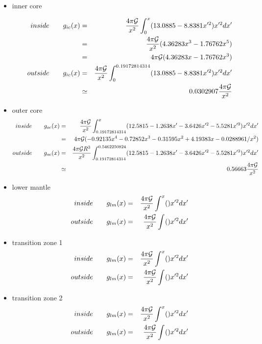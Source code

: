 \begin{itemize}
\item inner core 

\begin{eqnarray}
inside \qquad g_{ic}(x)
&=& \frac{4 \pi {\cal G}}{x^2} \int_0^{x} (13.0885-8.8381 x'^2) x'^2 dx' \nonumber\\
&=& \frac{4 \pi {\cal G}}{x^2} (4.36283x^3-1.76762x^5) \nonumber\\
&=& 4 \pi {\cal G} (4.36283x-1.76762x^3) \\
outside \qquad g_{ic}(x)
&=&  \frac{4 \pi {\cal G}}{x^2} \int_0^{0.19172814314} (13.0885-8.8381 x'^2) x'^2 dx' \nonumber\\
&\simeq& 0.0302907  \frac{4 \pi {\cal G}}{x^2}
\end{eqnarray}



\item outer core 
\begin{eqnarray}
inside \qquad g_{oc}(x) 
&=& \frac{4 \pi {\cal G}}{x^2} \int_{0.19172814314}^{x} ( 12.5815-1.2638x'-3.6426x'^2-5.5281x'^3) x'^2 dx' \nonumber\\
&=& 4 \pi {\cal G} (-0.92135x^4 - 0.72852x^3 - 0.31595x^2+4.19383x-0.0288961/x^2) \\
outside \qquad g_{oc}(x)
&=&  \frac{4 \pi {\cal G} R^3}{x^2} 
\int_{0.19172814314}^{0.5462250824} (12.5815-1.2638x'-3.6426x'^2-5.5281x'^3)x'^2 dx'  \nonumber\\
&\simeq& 0.56663  \frac{4 \pi {\cal G}}{x^2}
\end{eqnarray}

\item lower mantle 
\begin{eqnarray}
inside \qquad g_{lm}(x)  &=& \frac{4 \pi {\cal G}}{x^2} \int_{}^{x} () x'^2 dx' \nonumber\\ 
outside \qquad g_{lm}(x) &=&  \frac{4 \pi {\cal G}}{x^2} \int_{}^{} () x'^2 dx' \nonumber\\  
\end{eqnarray}

\item transition zone 1 
\begin{eqnarray}
inside \qquad g_{lm}(x)  &=& \frac{4 \pi {\cal G}}{x^2} \int_{}^{x} () x'^2 dx' \nonumber\\ 
outside \qquad g_{lm}(x) &=&  \frac{4 \pi {\cal G}}{x^2} \int_{}^{} () x'^2 dx' \nonumber\\  
\end{eqnarray}

\item transition zone 2 
\begin{eqnarray}
inside \qquad g_{lm}(x)  &=& \frac{4 \pi {\cal G}}{x^2} \int_{}^{x} () x'^2 dx' \nonumber\\ 
outside \qquad g_{lm}(x) &=&  \frac{4 \pi {\cal G}}{x^2} \int_{}^{} () x'^2 dx' \nonumber\\  
\end{eqnarray}


\end{itemize}
